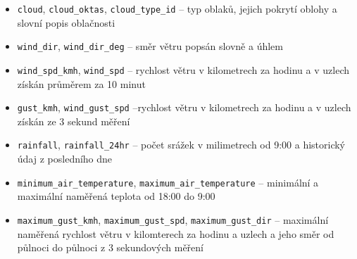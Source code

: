 \documentclass[11pt,a4paper,titlepage]{extarticle}
\begin{document}
\begin{itemize}
\begin{itemize}[label=\textperiodcentered]
        \item \texttt{cloud}, \texttt{cloud\_oktas}, \texttt{cloud\_type\_id} -- typ oblaků, jejich pokrytí oblohy a slovní popis oblačnosti
        \item \texttt{wind\_dir}, \texttt{wind\_dir\_deg} -- směr větru popsán slovně a úhlem 
        \item \texttt{wind\_spd\_kmh}, \texttt{wind\_spd} -- rychlost větru v kilometrech za hodinu a v uzlech získán průměrem za 10 minut
        \item \texttt{gust\_kmh}, \texttt{wind\_gust\_spd} --rychlost větru v kilometrech za hodinu a v uzlech získán ze 3 sekund měření
        \item \texttt{rainfall}, \texttt{rainfall\_24hr} -- počet srážek v milimetrech od 9:00 a historický údaj z posledního dne
        \item \texttt{minimum\_air\_temperature}, \texttt{maximum\_air\_temperature} -- minimální a maximální naměřená teplota od 18:00 do 9:00
        \item \texttt{maximum\_gust\_kmh}, \texttt{maximum\_gust\_spd}, \texttt{maximum\_gust\_dir} -- maximální naměřená rychlost větru v kilomterech za hodinu a uzlech a jeho směr od půlnoci do půlnoci z 3 sekundových měření
    \end{itemize}
\end{itemize}
\end{document}

